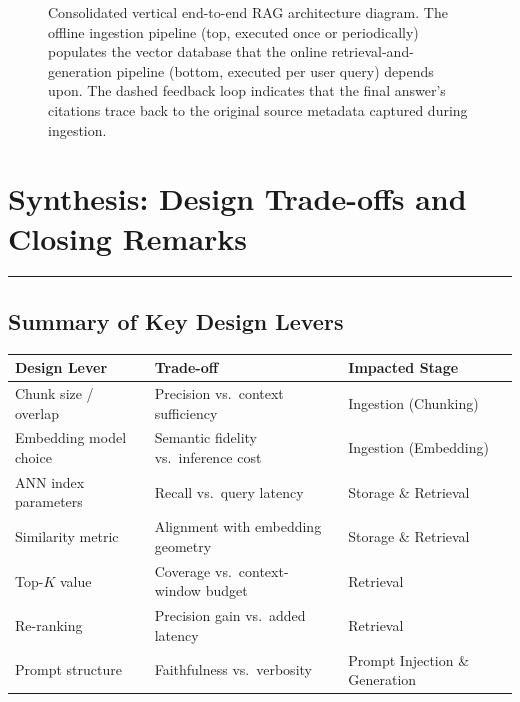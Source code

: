 \documentclass[11pt,a4paper]{article}
\newcommand{\sectionrule}{\vspace{-0.2cm}\noindent\textcolor{ragblue!40}{\rule{\linewidth}{0.6pt}}\vspace{0.3cm}}
\begin{document}
\begin{figure}[htbp]
\caption{Consolidated vertical end-to-end RAG architecture diagram. The offline ingestion pipeline (top, executed once or periodically) populates the vector database that the online retrieval-and-generation pipeline (bottom, executed per user query) depends upon. The dashed feedback loop indicates that the final answer's citations trace back to the original source metadata captured during ingestion.}
\label{fig:full-vertical-pipeline}
\end{figure}

\newpage

\section{Synthesis: Design Trade-offs and Closing Remarks}
\sectionrule

\subsection{Summary of Key Design Levers}

\begin{center}
\begin{tabular}{@{}p{3.6cm}p{5.6cm}p{5.2cm}@{}}
\toprule
\textbf{Design Lever} & \textbf{Trade-off} & \textbf{Impacted Stage} \\
\midrule
Chunk size / overlap & Precision vs.\ context sufficiency & Ingestion (Chunking) \\
Embedding model choice & Semantic fidelity vs.\ inference cost & Ingestion (Embedding) \\
ANN index parameters & Recall vs.\ query latency & Storage \& Retrieval \\
Similarity metric & Alignment with embedding geometry & Storage \& Retrieval \\
Top-$K$ value & Coverage vs.\ context-window budget & Retrieval \\
Re-ranking & Precision gain vs.\ added latency & Retrieval \\
Prompt structure & Faithfulness vs.\ verbosity & Prompt Injection \& Generation \\
\bottomrule
\end{tabular}
\end{center}
\end{document}
